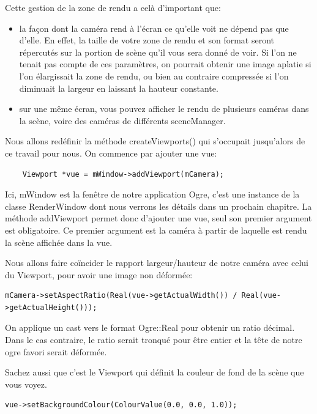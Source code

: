 \documentclass[10pt,a4paper]{report}
\begin{document}
Cette gestion de la zone de rendu a cel\`{a} d'important que:
\begin{itemize}
\item la fa\c{c}on dont la cam\'era rend \`{a} l'\'ecran ce qu'elle voit ne d\'epend pas que d'elle. En effet, la taille de votre zone de rendu et son format seront r\'epercut\'es sur la portion de sc\`ene qu'il vous sera donn\'e de voir. Si l'on ne tenait pas compte de ces param\`etres, on pourrait obtenir une image aplatie si l'on \'elargissait la zone de rendu, ou bien au contraire compress\'ee si l'on diminuait la largeur en laissant la hauteur constante.
\item sur une m\^eme \'ecran, vous pouvez afficher le rendu de plusieurs cam\'eras dans la sc\`ene, voire des cam\'eras de diff\'erents sceneManager.
\end{itemize}


Nous allons red\'efinir la m\'ethode createViewports() qui s'occupait jusqu'alors de ce travail pour nous. On commence par ajouter une vue:

\begin{lstlisting}
	Viewport *vue = mWindow->addViewport(mCamera);
\end{lstlisting}

Ici, mWindow est la fen\^etre de notre application Ogre, c'est une instance de la classe RenderWindow dont nous verrons les d\'etails dans un prochain chapitre. La m\'ethode addViewport permet donc d'ajouter une vue, seul son premier argument est obligatoire. Ce premier argument est la cam\'era \`a partir de laquelle est rendu la sc\`ene affich\'ee dans la vue.

Nous allons faire co\"incider le rapport largeur/hauteur de notre cam\'era avec celui du Viewport, pour avoir une image non d\'eform\'ee:
\begin{lstlisting}
mCamera->setAspectRatio(Real(vue->getActualWidth()) / Real(vue->getActualHeight()));
\end{lstlisting}

On applique un cast vers le format Ogre::Real pour obtenir un ratio d\'ecimal. Dans le cas contraire, le ratio serait tronqu\'e pour \^etre entier et la t\^ete de notre ogre favori serait d\'eform\'ee.

Sachez aussi que c'est le Viewport qui d\'efinit la couleur de fond de la sc\`ene que vous voyez. 
\begin{lstlisting}
vue->setBackgroundColour(ColourValue(0.0, 0.0, 1.0));
\end{lstlisting}
\end{document}
